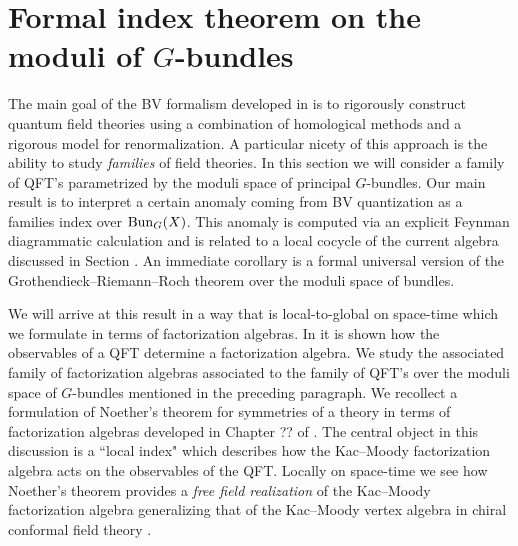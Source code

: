 \def\Bun{{\rm Bun}}

\section{Formal index theorem on the moduli of $G$-bundles}

%

The main goal of the BV formalism developed in \cite{CosBook} is to rigorously construct quantum field theories using a combination of homological methods and a rigorous model for renormalization. 
A particular nicety of this approach is the ability to study {\em families} of field theories. 
In this section we will consider a family of QFT's parametrized by the moduli space of principal $G$-bundles. 
Our main result is to interpret a certain anomaly coming from BV quantization as a families index over ${\rm Bun}_G(X)$. 
This anomaly is computed via an explicit Feynman diagrammatic calculation and is related to a local cocycle of the current algebra discussed in Section . 
An immediate corollary is a formal universal version of the Grothendieck--Riemann--Roch theorem over the moduli space of bundles. 

We will arrive at this result in a way that is local-to-global on space-time which we formulate in terms of factorization algebras.
In \cite{CG1, CG2} it is shown how the observables of a QFT determine a factorization algebra. 
We study the associated family of factorization algebras associated to the family of QFT's over the moduli space of $G$-bundles mentioned in the preceding paragraph. 
We recollect a formulation of Noether's theorem for symmetries of a theory in terms of factorization algebras developed in Chapter ?? of \cite{CG2}. 
The central object in this discussion is a ``local index" which describes how the Kac--Moody factorization algebra acts on the observables of the QFT. 
Locally on space-time we see how Noether's theorem provides a {\em free field realization} of the Kac--Moody factorization algebra generalizing that of the Kac--Moody vertex algebra in chiral conformal field theory \cite{??}. 

